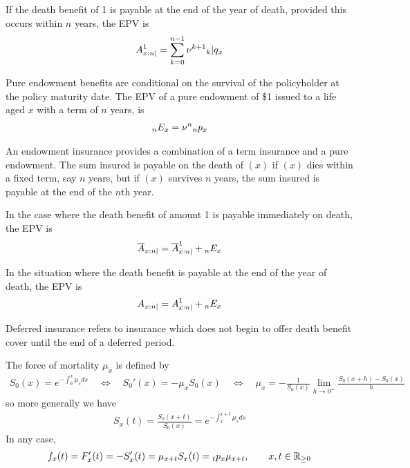 \documentclass[hidelinks, 12pt]{article}
\theoremstyle{mydefstyle}
\theoremstyle{mythmstyle}
\begin{document}
If the death benefit of 1 is payable at the end of the year of death, provided this occurs within $n$ years, the EPV is
\begin{gather*}
A_{x:n|}^1 = \sum_{k=0}^{n-1} \nu^{k+1} \hspace{0mm}_k\vert q_x
\end{gather*}

Pure endowment benefits are conditional on the survival of the policyholder at the policy maturity date. The EPV of a pure endowment of \$1 issued to a life aged $x$ with a term of $n$ years, is
\begin{gather*}
\hspace{0mm}_nE_x = \nu^n \hspace{0mm}_np_x
\end{gather*}

An endowment insurance provides a combination of a term insurance and a pure endowment. The sum insured is payable on the death of $(x)$ if $(x)$ dies within a fixed term, say $n$ years, but if $(x)$ survives $n$ years, the sum insured is payable at the end of the $n$th year. 

In the case where the death benefit of amount 1 is payable immediately on death, the EPV is
\begin{gather*}
\overline{A}_{x:n|} = \overline{A}_{x:n|}^1 + \hspace{0mm}_nE_x
\end{gather*}

In the situation where the death benefit is payable at the end of the year of death, the EPV is
\begin{gather*}
A_{x:n|} = A_{x:n|}^1 + \hspace{0mm}_nE_x
\end{gather*}

Deferred insurance refers to insurance which does not begin to offer death benefit cover until the end of a deferred period. 

The force of mortality $\mu_x$ is defined by
\begin{gather*}
S_0(x) = e^{-\int_0^x \mu_s ds} \quad\Leftrightarrow\quad S_0'(x) = -\mu_x S_0(x) \quad\Leftrightarrow\quad
\mu_x = -\frac{1}{S_0(x)} \lim_{h \to 0^+} \frac{S_0(x+h) - S_0(x)}{h}
\end{gather*}
so more generally we have
\begin{gather*}
S_x(t) = \frac{S_0(x+t)}{S_0(x)} = e^{-\int_x^{x+t} \mu_s ds}
\end{gather*}
In any case,
\begin{gather*}
f_x(t) = F_x'(t) = - S_x'(t) = \mu_{x+t} S_x(t) = \hspace{0mm}_tp_x \mu_{x+t}, \qquad x, t \in \mathbb{R}_{\ge 0}
\end{gather*}
\end{document}
